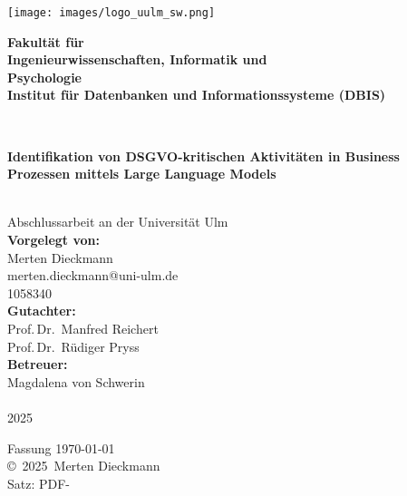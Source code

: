 \documentclass[a4paper,12pt,
headsepline,           %
oneside,               %
pointlessnumbers,      %
bibtotoc,              %
BCOR15mm               %
]{scrbook}
\makeatletter
\newcommand{\fullname}{Merten Dieckmann}
\newcommand{\email}{merten.dieckmann@uni-ulm.de}
\newcommand{\titel}{Identifikation von DSGVO-kritischen Aktivitäten in Business Prozessen mittels Large Language Models}
\newcommand{\jahr}{2025}
\newcommand{\matnr}{1058340}
\newcommand{\gutachterA}{Prof.\,Dr.\, Manfred Reichert}
\newcommand{\gutachterB}{Prof.\,Dr.\, Rüdiger Pryss}
\newcommand{\betreuer}{Magdalena von Schwerin}
\newcommand{\fakultaet}{Ingenieurwissenschaften, Informatik und\\Psychologie}
\newcommand{\institut}{Institut für Datenbanken und Informationssysteme (DBIS)}
\makeatother
\begin{document}
\frontmatter

\thispagestyle{empty}
\begin{addmargin*}[4mm]{-10mm}

\hfill
\texttt{[image: images/logo\_uulm\_sw.png]}\\[1em]

{\footnotesize
\hspace*{115mm}\parbox[t]{35mm}{\bfseries Fakultät für\\
\fakultaet\\
\mdseries \institut}\\[2cm]

\parbox{140mm}{\bfseries \LARGE \titel}\\[2.5em]
{\footnotesize Abschlussarbeit an der Universität Ulm}\\[3em]

{\footnotesize \bfseries Vorgelegt von:}\\
{\footnotesize \fullname\\ \email}\\ \matnr\\[2em]
{\footnotesize \bfseries Gutachter:}\\                     
{\footnotesize \gutachterA\\ \gutachterB}\\[2em]
{\footnotesize \bfseries Betreuer:}\\ 
{\footnotesize \betreuer}\\\\
{\footnotesize \jahr}
}
\end{addmargin*}


\clearpage
\thispagestyle{empty}
{ \small
  \flushleft
  Fassung \today \\\vfill
  \copyright~\jahr~\fullname\\[0.5em]
  Satz: PDF-\LaTeXe
}
\end{document}

